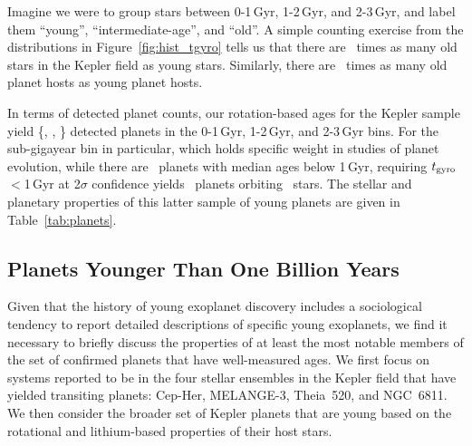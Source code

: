 \documentclass[11pt,twocolumn,tighten]{aastex63}
\begin{document}
Imagine we were to group stars between 0-1\,Gyr, 1-2\,Gyr, and
2-3\,Gyr, and label them ``young'', ``intermediate-age'', and ``old''.
A simple counting exercise from the distributions in
Figure~\ref{fig:hist_tgyro} tells us that there are \ratioobtoybstars\
times as many old stars in the Kepler field as young stars.
Similarly, there are \ratioobtoybplanets\ times as many old planet
hosts as young planet hosts. 

In terms of detected planet counts, our rotation-based ages for
the Kepler sample yield \{\nplyounggyro, \nplmidgyro, \nploldgyro\}
detected planets in the 0-1\,Gyr, 1-2\,Gyr, and 2-3\,Gyr bins.
For the sub-gigayear bin in particular, which holds specific weight in
studies of planet evolution, while there are \nplyounggyro\ planets
with median ages below 1\,Gyr, requiring $t_{\rm
gyro}$$<$1\,Gyr at 2$\sigma$ confidence yields
\nplyounggyrotwosigma\ planets orbiting \nplhostsyounggyrotwosigma\
stars.
The stellar and planetary properties of this latter sample of young
planets are given in Table~\ref{tab:planets}.


\subsection{Planets Younger Than One Billion Years}

%	
%





Given that the history of young exoplanet discovery includes a
sociological tendency to report detailed descriptions of specific
young exoplanets, we find it necessary to briefly discuss the
properties of at least the most notable members of the set of
confirmed planets that have well-measured ages.
We first focus on systems reported to be in the four stellar
ensembles in the Kepler field that have yielded transiting planets:
Cep-Her, MELANGE-3, Theia~520, and NGC~6811.
We then consider the broader set of Kepler planets that are young
based on the rotational and lithium-based properties of their host
stars.
\end{document}

